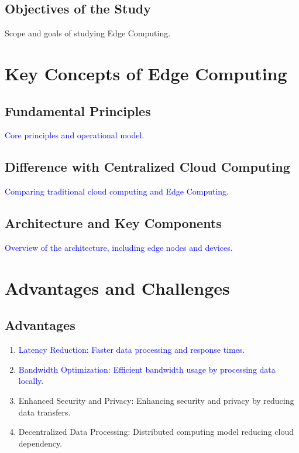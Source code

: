 \documentclass[runningheads]{llncs}
\begin{document}
\subsection{Objectives of the Study}
Scope and goals of studying Edge Computing.

\section{Key Concepts of Edge Computing}
\subsection{Fundamental Principles}
\textcolor{blue}{Core principles and operational model.}

\subsection{Difference with Centralized Cloud Computing}
\textcolor{blue}{Comparing traditional cloud computing and Edge Computing.}

\subsection{Architecture and Key Components}
\textcolor{blue}{Overview of the architecture, including edge nodes and devices.}

\section{Advantages and Challenges}
\subsection{Advantages}

\begin{enumerate}
    \item \textcolor{blue}{Latency Reduction: Faster data processing and response times.}
    \item \textcolor{blue}{Bandwidth Optimization: Efficient bandwidth usage by processing data locally.}
    \item Enhanced Security and Privacy: Enhancing security and privacy by reducing data transfers.
    \item Decentralized Data Processing: Distributed computing model reducing cloud dependency.
\end{enumerate}
\end{document}
